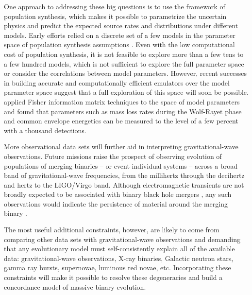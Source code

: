 \documentclass[iop,onecolumn]{revtex4}
\newcommand{\todo}[1]{\textcolor{red}{#1}}
\begin{document}
One approach to addressing these big questions is to use the framework of population synthesis, which makes it possible to parametrize the uncertain physics and predict the expected source rates and distributions under different models.  Early  efforts relied on a discrete set of a few models in the parameter space of population synthesis assumptions \citep{Dominik:2012,Stevenson:2015}.  Even with the low computational cost of population synthesis, it is not feasible to explore more than a few tens to a few hundred models, which is not sufficient to explore the full parameter space or consider the correlations between model parameters.  However, recent successes in building accurate and computationally efficient emulators over the model parameter space \citep{Barrett:2017} suggest that a full exploration of this space will soon be possible. \citet{Barrett:2017FIM} applied Fisher information matrix techniques to the space of model parameters and found that parameters such as mass loss rates during the Wolf-Rayet phase and common envelope energetics can be measured to the level of a few percent with a thousand detections. 

More observational data sets will further aid in interpreting gravitational-wave observations.  Future missions raise the prospect of observing evolution of populations of merging binaries -- or event individual systems -- across a broad band of gravitational-wave frequencies, from the millihertz \citep[e.g.,][]{Sesana:2016} through the decihertz \citep{Mandel:2017} and hertz \citep{ET:2012} to the LIGO/Virgo band.  Although electromagnetic transients are not broadly expected to be associated with binary black hole mergers \citep[e.g.,][]{Lyutikov:2016}, any such observations would indicate the persistence of material around the merging binary \citep[e.g.,][]{deMinkKing:2017}.  %

The most useful additional constraints, however, are likely to come from comparing other data sets with gravitational-wave observations and demanding that any evolutionary model must self-consistently explain all of the available data: gravitational-wave observations, X-ray binaries, Galactic neutron stars, gamma ray bursts, supernovae, luminous red novae, etc.   Incorporating these constraints will make it possible to resolve these degeneracies and build a concordance model of massive binary evolution.  %
\end{document}
